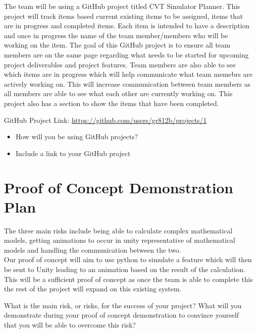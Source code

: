 \documentclass{article}
\begin{document}
The team will be using a GitHub project titled CVT Simulator Planner. 
This project will track items based current existing items to be assigned, items that are in progress and completed items. Each item is intended to have a description and once in progress the name of the team member/members who will be working on the item.
The goal of this GitHub project is to ensure all team members are on the same page regarding what needs to be started for upcoming project deliverables and project features. 
Team members are also able to see which items are in progress which will help communicate what team memebrs are actively working on.
This will increase communication between team members as all members are able to see what each other are currently working on.
This project also has a section to show the items that have been completed. 

GitHub Project Link: \url{https://github.com/users/gr812b/projects/1}


\begin{itemize}
  \item How will you be using GitHub projects?
  \item Include a link to your GitHub project
\end{itemize}


\section{Proof of Concept Demonstration Plan}

The three main risks include being able to calculate complex mathematical models, getting animations to occur in unity representative of mathematical models and handling the communication between the two. 
\\
\noindent Our proof of concept will aim to use python to simulate a feature which will then be sent to Unity leading to an animation based on the result of the calculation. 
This will be a sufficient proof of concept as once the team is able to complete this the rest of the project will expand on this existing system. 

What is the main risk, or risks, for the success of your project?  What will you
demonstrate during your proof of concept demonstration to convince yourself that
you will be able to overcome this risk?
\end{document}
